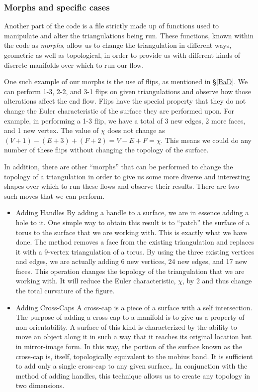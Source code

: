 \documentclass[12pt]{article}
\begin{document}
\subsubsection{Morphs and specific cases}

Another part of the code is a file strictly made up of functions used to manipulate and alter the triangulations being run. These functions, known within the code as \textit{morphs}, allow us to change the triangulation in different ways, geometric as well as topological, in order to provide us with different kinds of discrete manifolds over which to run our flow.\newline

One such example of our morphs is the use of flips, as mentioned in \S\ref{BaD}. We can perform 1-3, 2-2, and 3-1 flips on given triangulations and observe how those alterations affect the end flow. Flips have the special property that they do not change the Euler characteristic of the surface they are performed upon. For example, in performing a 1-3 flip, we have a total of 3 new edges, 2 more faces, and 1 new vertex. The value of $\chi$ does not change as $(V+1) - (E+3) + (F+2) = V - E + F = \chi$. This means we could do any number of these flips without changing the topology of the surface.\newline

In addition, there are other ``morphs'' that can be performed to change the topology of a triangulation in order to give us some more diverse and interesting shapes over which to run these flows and observe their results. There are two such moves that we can perform.

\begin{itemize}
\item Adding Handles \newline
By adding a handle to a surface, we are in essence adding a hole to it. One simple way to obtain this result is to ``patch'' the surface of a torus to the surface that we are working with. This is exactly what we have done. The method removes a face from the existing triangulation and replaces it with a 9-vertex triangulation of a torus. By using the three existing vertices and edges, we are actually adding 6 new vertices, 24 new edges, and 17 new faces. This operation changes the topology of the triangulation that we are working with. It will reduce the Euler characteristic, $\chi$, by 2 and thus change the total curvature of the figure.
\item Adding Cross-Caps \newline
A cross-cap is a piece of a surface with a self intersection. The purpose of adding a cross-cap to a manifold is to give us a property of non-orientability. A surface of this kind is characterized by the ability to move an object along it in such a way that it reaches its original location but in mirror-image form. In this way, the portion of the surface known as the cross-cap is, itself, topologically equivalent to the mobius band. It is sufficient to add only a single cross-cap to any given surface,. In conjunction with the method of adding handles, this technique allows us to create any topology in two dimensions.
\end{itemize}
\end{document}
